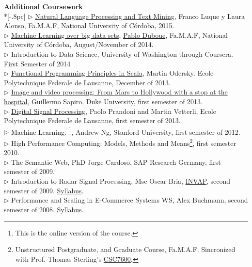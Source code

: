 \documentclass[letter,11pt,english]{article}
\begin{document}
{\large \bf Additional Coursework}\\ *[-.8pc]
\underline{\hspace{6in}}
$\triangleright$ \href{http://cs.famaf.unc.edu.ar/wiki/materias/pln}{Natural Language Processing and Text Mining}, Franco Luque y Laura Alonso, Fa.M.A.F, National University of C\'ordoba, 2015.\\
$\triangleright$ \href{http://aprendizajengrande.net/}{Machine Learning over big data sets},  \href{http://duboue.net/}{Pablo Duboue}, Fa.M.A.F, National University of C\'ordoba, August/November of 2014.\\
$\triangleright$ Introduction to Data Science, University of Washington through Coursera. First Semester
of 2014\\
$\triangleright$ \href{https://www.coursera.org/course/progfun}{Functional Programming Principles in Scala},  Martin Odersky. Ecole Polytechnique Federale de Lausanne, December of 2013.  \\
$\triangleright$ \href{https://www.coursera.org/course/images}{Image and video processing: From Mars to Hollywood with a stop at the hospital}, Guillermo Sapiro, Duke University, first semester of 2013. \\
$\triangleright$ \href{https://www.coursera.org/course/dsp}{Digital Signal Processing}, Paolo Prandoni and Martin Vetterli, Ecole Polytechnique Federale de Lausanne, first semester of 2013.\\
$\triangleright$ \href{http://www.ml-class.org}{Machine Learning}. \footnote{This is the online version of the course.}, Andrew Ng, Stanford University, first semester of 2012. \\
$\triangleright$ High Performance Computing: Models, Methods and Means\footnote{Unstructured Postgraduate,
and Graduate Course, Fa.M.A.F. Sincronized with Prof. Thomas Sterling's 
\href{https://www.cct.lsu.edu/csc7600/Home.html}{CSC7600}.}, first semester 2010.\\
$\triangleright$ The Semantic Web, PhD Jorge Cardoso, SAP Research Germany, first semester of 2009.\\
$\triangleright$ Introduction to Radar Signal Processing, Msc Oscar Bria, 
\href{http://www.invap.net/index-e.php}{INVAP}, second semester of 2009. \href{http://postgrado.info.unlp.edu.ar/Cursos/Cursos/11-2011_Introduccion_al_Procesamiento_de_Senales_Radar.pdf}{Syllabus}.\\
$\triangleright$ Performance and Scaling in E-Commerce Systems WS, Alex Buchmann, second semester of 2008. 
\href{http://www.dvs.tu-darmstadt.de/teaching/perf/2008/}{Syllabus}.\\
\end{document}
